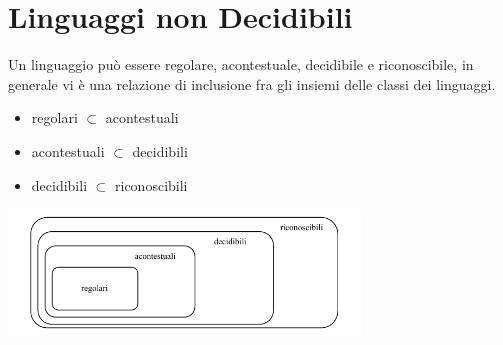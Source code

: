 \documentclass[10pt, letterpaper]{report}
\begin{document}
\section{Linguaggi non Decidibili}
Un linguaggio può essere regolare, acontestuale, decidibile e riconoscibile, in generale vi è una relazione di inclusione fra gli insiemi delle classi dei linguaggi.\begin{itemize}
    \item regolari $\subset$ acontestuali  
    \item acontestuali $\subset$ decidibili 
    \item decidibili $\subset$ riconoscibili 
\end{itemize}
\begin{center}
    \includegraphics[width=0.7\textwidth ]{images/insiemiLinguaggi.pdf}
\end{center}
\end{document}
